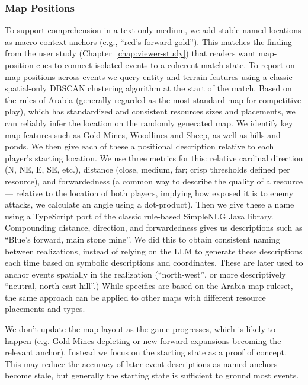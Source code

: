 \subsubsection{Map Positions}
To support comprehension in a text-only medium, we add stable named locations as macro-context anchors (e.g., ``red's forward gold''). This matches the finding from the user study (Chapter~\ref{chap:viewer-study}) that readers want map-position cues to connect isolated events to a coherent match state.
To report on map positions across events we query entity and terrain features using a classic spatial-only DBSCAN clustering algorithm at the start of the match. Based on the rules of Arabia (generally regarded as the most standard map for competitive play), which has standardized and consistent resources sizes and placements, we can reliably infer the location on the randomly generated map. We identify key map features such as Gold Mines, Woodlines and Sheep, as well as hills and ponds. We then give each of these a positional description relative to each player's starting location. We use three metrics for this: relative cardinal direction (N, NE, E, SE, etc.), distance (close, medium, far; crisp thresholds defined per resource), and forwardedness (a common way to describe the quality of a resource --- relative to the location of both players, implying how exposed it is to enemy attacks, we calculate an angle using a dot-product). Then we give these a name using a TypeScript port of the classic rule-based SimpleNLG Java library\cite{simpleNLG}. Compounding distance, direction, and forwardedness gives us descriptions such as ``Blue's forward, main stone mine''. We did this to obtain consistent naming between realizations, instead of relying on the LLM to generate these descriptions each time based on symbolic descriptions and coordinates. These are later used to anchor events spatially in the realization (``north-west'', or more descriptively ``neutral, north-east hill''.) While specifics are based on the Arabia map ruleset, the same approach can be applied to other maps with different resource placements and types.

We don't update the map layout as the game progresses, which is likely to happen (e.g. Gold Mines depleting or new forward expansions becoming the relevant anchor). Instead we focus on the starting state as a proof of concept. This may reduce the accuracy of later event descriptions as named anchors become stale, but generally the starting state is sufficient to ground most events.

